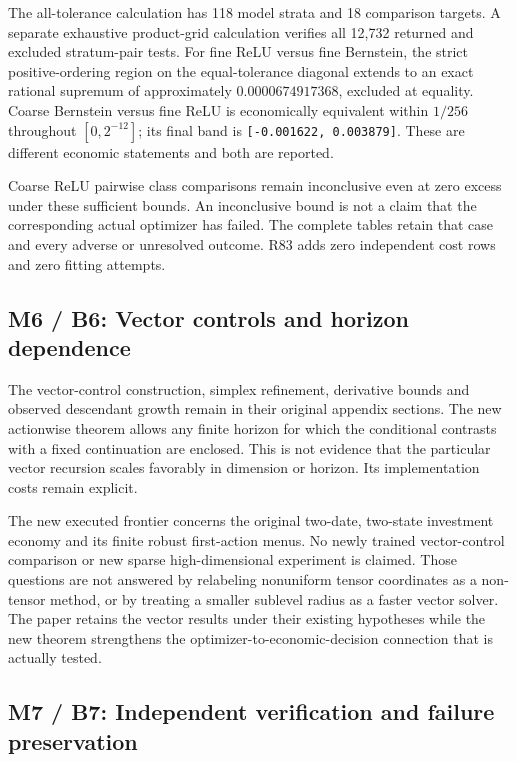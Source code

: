 \documentclass[ecta,nameyear,draft]{econsocart}
\begin{document}
The all-tolerance calculation has 118 model strata and 18 comparison
targets. A separate exhaustive product-grid calculation verifies all
12,732 returned and excluded stratum-pair tests. For fine ReLU versus
fine Bernstein, the strict positive-ordering region on the
equal-tolerance diagonal extends to an exact rational supremum of
approximately \(0.0000674917368\), excluded at equality. Coarse
Bernstein versus fine ReLU is economically equivalent within \(1/256\)
throughout \([0,2^{-12}]\); its final band is
\texttt{{[}-0.001622,\ 0.003879{]}}. These are different economic
statements and both are reported.

Coarse ReLU pairwise class comparisons remain inconclusive even at zero
excess under these sufficient bounds. An inconclusive bound is not a
claim that the corresponding actual optimizer has failed. The complete
tables retain that case and every adverse or unresolved outcome. R83
adds zero independent cost rows and zero fitting attempts.

\hypertarget{m6-b6-vector-controls-and-horizon-dependence}{%
\subsection{M6 / B6: Vector controls and horizon
dependence}\label{m6-b6-vector-controls-and-horizon-dependence}}

The vector-control construction, simplex refinement, derivative bounds
and observed descendant growth remain in their original appendix
sections. The new actionwise theorem allows any finite horizon for which
the conditional contrasts with a fixed continuation are enclosed. This
is not evidence that the particular vector recursion scales favorably in
dimension or horizon. Its implementation costs remain explicit.

The new executed frontier concerns the original two-date, two-state
investment economy and its finite robust first-action menus. No newly
trained vector-control comparison or new sparse high-dimensional
experiment is claimed. Those questions are not answered by relabeling
nonuniform tensor coordinates as a non-tensor method, or by treating a
smaller sublevel radius as a faster vector solver. The paper retains the
vector results under their existing hypotheses while the new theorem
strengthens the optimizer-to-economic-decision connection that is
actually tested.

\hypertarget{m7-b7-independent-verification-and-failure-preservation}{%
\subsection{M7 / B7: Independent verification and failure
preservation}\label{m7-b7-independent-verification-and-failure-preservation}}
\end{document}
